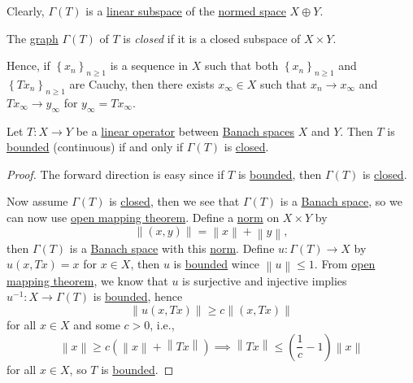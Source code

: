 Clearly, \(\Gamma (T)\) is a \hyperref[def:linear-vector-space]{linear subspace} of the \hyperref[def:normed-vector-space]{normed space} \(X\oplus Y\).

\begin{definition}\label{def:closed-graph}
	The \hyperref[def:graph]{graph} \(\Gamma (T)\) of \(T\) is \emph{closed} if it is a closed subspace of \(X \times Y\).
\end{definition}

Hence, if \(\left\{ x_n \right\} _{n\geq 1}\) is a sequence in \(X\) such that both \(\left\{ x_n \right\} _{n\geq 1}\) and \(\left\{ Tx_n \right\}_{n\geq 1} \) are Cauchy, then there exists \(x_\infty \in X\) such that \(x_n \to x_\infty \) and \(Tx_\infty \to y_\infty \) for \(y_\infty = Tx_\infty \).

\begin{theorem}\label{thm:closed-graph}
	Let \(T\colon X\to Y\) be a \hyperref[def:linear-op]{linear operator} between \hyperref[def:Banach-space]{Banach spaces} \(X\) and \(Y\). Then \(T\) is \hyperref[def:bounded-linear-op]{bounded} (continuous) if and only if \(\Gamma (T)\) is \hyperref[def:closed-graph]{closed}.
\end{theorem}
\begin{proof}
	The forward direction is easy since if \(T\) is \hyperref[def:bounded-linear-op]{bounded}, then \(\Gamma (T)\) is \hyperref[def:closed-graph]{closed}.

	Now assume \(\Gamma (T)\) is \hyperref[def:closed-graph]{closed}, then we see that \(\Gamma (T)\) is a \hyperref[def:Banach-space]{Banach space}, so we can now use \hyperref[thm:open-mapping]{open mapping theorem}. Define a \hyperref[def:norm]{norm} on \(X \times Y\) by
	\[
		\left\lVert (x, y)\right\rVert = \left\lVert x\right\rVert + \left\lVert y\right\rVert,
	\]
	then \(\Gamma (T)\) is a \hyperref[def:Banach-space]{Banach space} with this \hyperref[def:norm]{norm}. Define \(u\colon \Gamma (T)\to X\) by \(u(x, Tx)=x\) for \(x\in X\), then \(u\) is \hyperref[rmk:bounded-op]{bounded} wince \(\left\lVert u\right\rVert \leq 1\). From \hyperref[thm:open-mapping]{open mapping theorem}, we know that \(u\) is surjective and injective implies \(u^{-1} \colon X\to \Gamma (T)\) is \hyperref[rmk:bounded-op]{bounded}, hence
	\[
		\left\lVert u(x, Tx)\right\rVert \geq c \left\lVert (x, Tx)\right\rVert
	\]
	for all \(x\in X\) and some \(c> 0\), i.e.,
	\[
		\left\lVert x\right\rVert \geq c \left( \left\lVert x\right\rVert + \left\lVert Tx\right\rVert  \right) \implies \left\lVert Tx\right\rVert \leq \left( \frac{1}{c}- 1 \right) \left\lVert x\right\rVert
	\]
	for all \(x\in X\), so \(T\) is \hyperref[rmk:bounded-op]{bounded}.
\end{proof}

